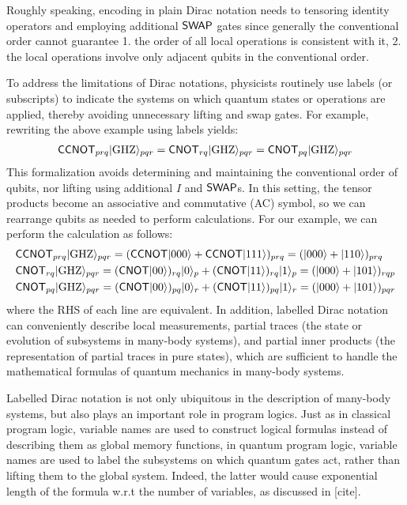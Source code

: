 \begin{example}
Roughly speaking, encoding in plain Dirac notation needs to
tensoring identity operators and employing additional ${\mathsf{SWAP}}$ gates
since generally the conventional order cannot guarantee 1. the order
of all local operations is consistent with it, 2. the local operations
involve only adjacent qubits in the conventional order.
\end{example}
To address the limitations of Dirac notations, physicists routinely
use labels (or subscripts) to indicate the systems on which quantum
states or operations are applied, thereby avoiding unnecessary lifting
and swap gates. For example, rewriting the above example using labels
yields:
\begin{align*}
  {\mathsf{CCNOT}}_{prq}|{\mathrm{GHZ}}\rangle_{pqr} = 
  {\mathsf{CNOT}}_{rq}|{\mathrm{GHZ}}\rangle_{pqr}
  = {\mathsf{CNOT}}_{pq}|{\mathrm{GHZ}}\rangle_{pqr}
\end{align*}
This formalization avoids determining and maintaining the conventional
order of qubits, nor lifting using additional $I$ and ${\mathsf{SWAP}}$s. In
this setting, the tensor products become an associative and
commutative (AC) symbol, so we can rearrange qubits as needed to
perform calculations. For our example, we can perform the calculation as
follows:
\begin{align*}
  &{\mathsf{CCNOT}}_{prq}|{\mathrm{GHZ}}\rangle_{pqr}
  = ({\mathsf{CCNOT}}|000\rangle + {\mathsf{CCNOT}}|111\rangle)_{prq}
  = (|000\rangle + |110\rangle)_{prq}\\
  &{\mathsf{CNOT}}_{rq}|{\mathrm{GHZ}}\rangle_{pqr}
  = ({\mathsf{CNOT}}|00\rangle)_{rq}|0\rangle_p + ({\mathsf{CNOT}}|11\rangle)_{rq}|1\rangle_p
  =(|000\rangle + |101\rangle)_{rqp}\\
  &{\mathsf{CNOT}}_{pq}|{\mathrm{GHZ}}\rangle_{pqr}
  = ({\mathsf{CNOT}}|00\rangle)_{pq}|0\rangle_r + ({\mathsf{CNOT}}|11\rangle)_{pq}|1\rangle_r
  = (|000\rangle + |101\rangle)_{pqr}
\end{align*}
where the RHS of each line are equivalent.  In addition, labelled
Dirac notation can conveniently describe local measurements, partial
traces (the state or evolution of subsystems in many-body systems),
and partial inner products (the representation of partial traces in
pure states), which are sufficient to handle the mathematical formulas
of quantum mechanics in many-body systems.

Labelled Dirac notation is not only ubiquitous in the description of many-body systems, but also plays an important role in program logics. Just as in classical program logic, variable names are used to construct logical formulas instead of describing them as global memory functions, in quantum program logic, variable names are used to label the subsystems on which quantum gates act, rather than lifting them to the global system. Indeed, the latter would cause exponential length of the formula w.r.t the number of variables, as discussed in [cite].

